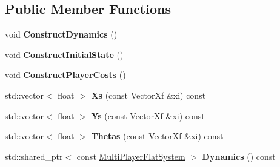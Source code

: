 \subsection*{Public Member Functions}
\begin{DoxyCompactItemize}
\item 
void {\bfseries Construct\+Dynamics} ()\hypertarget{classilqgames_1_1_three_player_flat_overtaking_example_a716df7f981ea53bc95dce9923a7b4f52}{}\label{classilqgames_1_1_three_player_flat_overtaking_example_a716df7f981ea53bc95dce9923a7b4f52}

\item 
void {\bfseries Construct\+Initial\+State} ()\hypertarget{classilqgames_1_1_three_player_flat_overtaking_example_a2f4030d054883a0b6a37465c4b5658cc}{}\label{classilqgames_1_1_three_player_flat_overtaking_example_a2f4030d054883a0b6a37465c4b5658cc}

\item 
void {\bfseries Construct\+Player\+Costs} ()\hypertarget{classilqgames_1_1_three_player_flat_overtaking_example_ab3b213945931bb4ea1c87d92a596715e}{}\label{classilqgames_1_1_three_player_flat_overtaking_example_ab3b213945931bb4ea1c87d92a596715e}

\item 
std\+::vector$<$ float $>$ {\bfseries Xs} (const Vector\+Xf \&xi) const \hypertarget{classilqgames_1_1_three_player_flat_overtaking_example_a47a85425d31dd4a5e4d4534b9ff50c83}{}\label{classilqgames_1_1_three_player_flat_overtaking_example_a47a85425d31dd4a5e4d4534b9ff50c83}

\item 
std\+::vector$<$ float $>$ {\bfseries Ys} (const Vector\+Xf \&xi) const \hypertarget{classilqgames_1_1_three_player_flat_overtaking_example_ad4c1ae9db31f1f25c71187692d94b05d}{}\label{classilqgames_1_1_three_player_flat_overtaking_example_ad4c1ae9db31f1f25c71187692d94b05d}

\item 
std\+::vector$<$ float $>$ {\bfseries Thetas} (const Vector\+Xf \&xi) const \hypertarget{classilqgames_1_1_three_player_flat_overtaking_example_a92be7f8ef2b6ee6e6ac4339a32a30991}{}\label{classilqgames_1_1_three_player_flat_overtaking_example_a92be7f8ef2b6ee6e6ac4339a32a30991}

\item 
std\+::shared\+\_\+ptr$<$ const \hyperlink{classilqgames_1_1_multi_player_flat_system}{Multi\+Player\+Flat\+System} $>$ {\bfseries Dynamics} () const \hypertarget{classilqgames_1_1_three_player_flat_overtaking_example_a33fb0ea831db32f859718c7a54d80c6f}{}\label{classilqgames_1_1_three_player_flat_overtaking_example_a33fb0ea831db32f859718c7a54d80c6f}

\end{DoxyCompactItemize}
